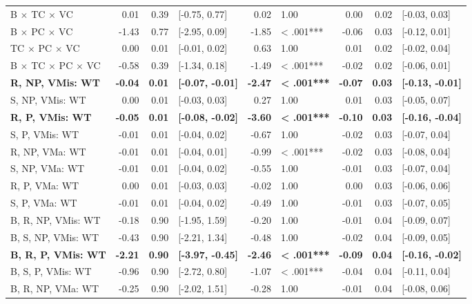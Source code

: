 \documentclass[doc,floatsintext]{apa6}
\begin{document}
\begin{table}[!h]
{\begin{tabular}{lrrlrlrrl}
B $\times$ TC $\times$ VC & 0.01 & 0.39 & [-0.75, 0.77] & 0.02 & 1.00 & 0.00 & 0.02 & [-0.03, 0.03]\\
B $\times$ PC $\times$ VC & -1.43 & 0.77 & [-2.95, 0.09] & -1.85 & < .001*** & -0.06 & 0.03 & [-0.12, 0.01]\\
TC $\times$ PC $\times$ VC & 0.00 & 0.01 & [-0.01, 0.02] & 0.63 & 1.00 & 0.01 & 0.02 & [-0.02, 0.04]\\
B $\times$ TC $\times$ PC $\times$ VC & -0.58 & 0.39 & [-1.34, 0.18] & -1.49 & < .001*** & -0.02 & 0.02 & [-0.06, 0.01]\\
\textbf{R, NP, VMis: WT} & \textbf{-0.04} & \textbf{0.01} & \textbf{[-0.07, -0.01]} & \textbf{-2.47} & \textbf{< .001***} & \textbf{-0.07} & \textbf{0.03} & \textbf{[-0.13, -0.01]}\\
S, NP, VMis: WT & 0.00 & 0.01 & [-0.03, 0.03] & 0.27 & 1.00 & 0.01 & 0.03 & [-0.05, 0.07]\\
\textbf{R, P, VMis: WT} & \textbf{-0.05} & \textbf{0.01} & \textbf{[-0.08, -0.02]} & \textbf{-3.60} & \textbf{< .001***} & \textbf{-0.10} & \textbf{0.03} & \textbf{[-0.16, -0.04]}\\
S, P, VMis: WT & -0.01 & 0.01 & [-0.04, 0.02] & -0.67 & 1.00 & -0.02 & 0.03 & [-0.07, 0.04]\\
R, NP, VMa: WT & -0.01 & 0.01 & [-0.04, 0.01] & -0.99 & < .001*** & -0.02 & 0.03 & [-0.08, 0.04]\\
S, NP, VMa: WT & -0.01 & 0.01 & [-0.04, 0.02] & -0.55 & 1.00 & -0.01 & 0.03 & [-0.07, 0.04]\\
R, P, VMa: WT & 0.00 & 0.01 & [-0.03, 0.03] & -0.02 & 1.00 & 0.00 & 0.03 & [-0.06, 0.06]\\
S, P, VMa: WT & -0.01 & 0.01 & [-0.04, 0.02] & -0.49 & 1.00 & -0.01 & 0.03 & [-0.07, 0.05]\\
B, R, NP, VMis: WT & -0.18 & 0.90 & [-1.95, 1.59] & -0.20 & 1.00 & -0.01 & 0.04 & [-0.09, 0.07]\\
B, S, NP, VMis: WT & -0.43 & 0.90 & [-2.21, 1.34] & -0.48 & 1.00 & -0.02 & 0.04 & [-0.09, 0.05]\\
\textbf{B, R, P, VMis: WT} & \textbf{-2.21} & \textbf{0.90} & \textbf{[-3.97, -0.45]} & \textbf{-2.46} & \textbf{< .001***} & \textbf{-0.09} & \textbf{0.04} & \textbf{[-0.16, -0.02]}\\
B, S, P, VMis: WT & -0.96 & 0.90 & [-2.72, 0.80] & -1.07 & < .001*** & -0.04 & 0.04 & [-0.11, 0.04]\\
B, R, NP, VMa: WT & -0.25 & 0.90 & [-2.02, 1.51] & -0.28 & 1.00 & -0.01 & 0.04 & [-0.08, 0.06]\\

\end{tabular}}
\end{table}
\end{document}
